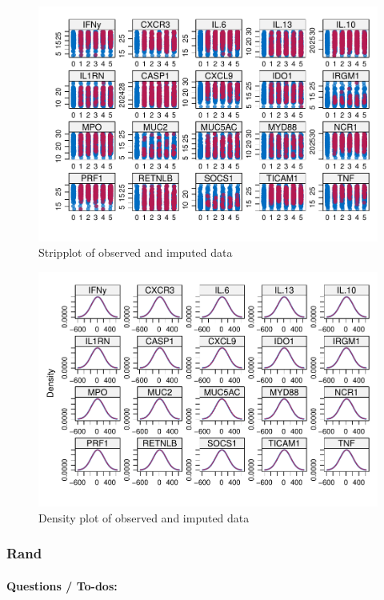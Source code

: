 \documentclass[webpdf,large,contemporary,namedate]{oup-authoring-template}
\theoremstyle{thmstyleone}
\theoremstyle{thmstyletwo}
\theoremstyle{thmstylethree}
\begin{document}
\begin{figure}[th]
\includegraphics[width=1\linewidth]{x_files/figure-latex/fig1-1} \caption{Stripplot of observed and imputed data}\label{fig:fig1}
\end{figure}

\begin{figure}[th]
\includegraphics[width=1\linewidth]{x_files/figure-latex/fig2-1} \caption{Density plot of observed and imputed data}\label{fig:fig2}
\end{figure}

\hypertarget{rand}{%
\subsubsection{Rand}\label{rand}}

\hypertarget{questions-to-dos}{%
\paragraph{Questions / To-dos:}\label{questions-to-dos}}
\end{document}
